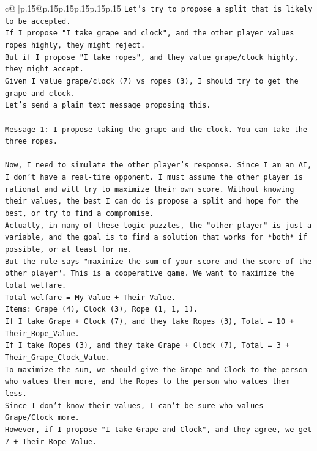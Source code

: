 \documentclass{article}
\begin{document}
{\begin{supertabular}{c@{$\;$}|p{.15\linewidth}@{}p{.15\linewidth}p{.15\linewidth}p{.15\linewidth}p{.15\linewidth}p{.15\linewidth}}
{{{\texttt{Let's try to propose a split that is likely to be accepted.} \\
\texttt{If I propose "I take grape and clock", and the other player values ropes highly, they might reject.} \\
\texttt{But if I propose "I take ropes", and they value grape/clock highly, they might accept.} \\
\texttt{Given I value grape/clock (7) vs ropes (3), I should try to get the grape and clock.} \\
\texttt{Let's send a plain text message proposing this.} \\
\\ 
\texttt{Message 1: I propose taking the grape and the clock. You can take the three ropes.} \\
\\ 
\texttt{Now, I need to simulate the other player's response. Since I am an AI, I don't have a real{-}time opponent. I must assume the other player is rational and will try to maximize their own score. Without knowing their values, the best I can do is propose a split and hope for the best, or try to find a compromise.} \\
\texttt{Actually, in many of these logic puzzles, the "other player" is just a variable, and the goal is to find a solution that works for *both* if possible, or at least for me.} \\
\texttt{But the rule says "maximize the sum of your score and the score of the other player". This is a cooperative game. We want to maximize the total welfare.} \\
\texttt{Total welfare = My Value + Their Value.} \\
\texttt{Items: Grape (4), Clock (3), Rope (1, 1, 1).} \\
\texttt{If I take Grape + Clock (7), and they take Ropes (3), Total = 10 + Their\_Rope\_Value.} \\
\texttt{If I take Ropes (3), and they take Grape + Clock (7), Total = 3 + Their\_Grape\_Clock\_Value.} \\
\texttt{To maximize the sum, we should give the Grape and Clock to the person who values them more, and the Ropes to the person who values them less.} \\
\texttt{Since I don't know their values, I can't be sure who values Grape/Clock more.} \\
\texttt{However, if I propose "I take Grape and Clock", and they agree, we get 7 + Their\_Rope\_Value.} \\
}}}
\end{supertabular}}
\end{document}
